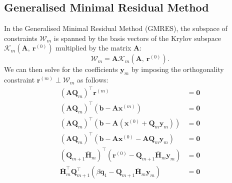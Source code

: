 \documentclass{article}
\begin{document}
\subsection{Generalised Minimal Residual Method}
In the Generalised Minimal Residual Method (GMRES), the subspace of
constraints \(\mathcal{W}_m\) is spanned by the basis vectors of the
Krylov subspace \(\mathcal{K}_m\left( \symbf{A},\: \symbf{r}^{\left( 0
\right)} \right)\) multiplied by the matrix \(\symbf{A}\):
\begin{equation*}
    \mathcal{W}_m = \symbf{A} \mathcal{K}_m\left( \symbf{A},\: \symbf{r}^{\left( 0 \right)} \right).
\end{equation*}
We can then solve for the coefficients \(\symbf{y}_m\) by imposing the
orthogonality constraint \(\symbf{r}^{\left( m \right)} \perp \mathcal{W}_m\)
as follows:
\begin{align*}
    \left( \symbf{A} \symbf{Q}_m \right)^\top \symbf{r}^{\left( m \right)}                                                                                    & = \symbf{0}                                                                                             \\
    \left( \symbf{A} \symbf{Q}_m \right)^\top \left( \symbf{b} - \symbf{A} \symbf{x}^{\left( m \right)} \right)                                               & = \symbf{0}                                                                                             \\
    \left( \symbf{A} \symbf{Q}_m \right)^\top \left( \symbf{b} - \symbf{A} \left( \symbf{x}^{\left( 0 \right)} + \symbf{Q}_m \symbf{y}_m \right) \right)      & = \symbf{0}                                                                                             \\
    \left( \symbf{A} \symbf{Q}_m \right)^\top \left( \symbf{b} - \symbf{A} \symbf{x}^{\left( 0 \right)} - \symbf{A} \symbf{Q}_m \symbf{y}_m \right)           & = \symbf{0}                                                                                             \\
    \left( \symbf{Q}_{m+1} \bar{\symbf{H}}_m \right)^\top \left( \symbf{r}^{\left( 0 \right)} - \symbf{Q}_{m+1} \bar{\symbf{H}}_m \symbf{y}_m \right)         & = \symbf{0}                                                                                             \\
    \bar{\symbf{H}}_m^\top \symbf{Q}_{m+1}^\top \left( \beta \symbf{q}_1 - \symbf{Q}_{m+1} \bar{\symbf{H}}_m \symbf{y}_m \right)                              & = \symbf{0}                                                                                             \\

\end{align*}
\end{document}
